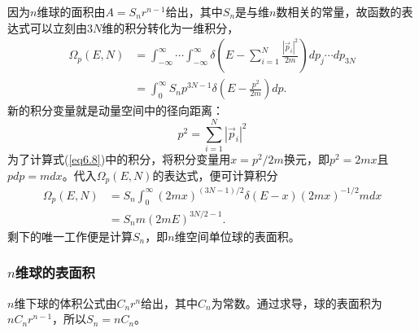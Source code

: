 \documentclass[UTF8]{ctexart}
\numberwithin{equation}{section}%
\numberwithin{figure}{section}%
\begin{document}
    因为$n$维球的面积由$A=S_nr^{n-1}$给出，其中$S_n$是与维$n$数相关的常量，故函数的表达式可以立刻由$3N$维的积分转化为一维积分，
    \begin{equation}\label{eq6.8}
        \begin{aligned}
            \Omega_{p}(E, N) &=\int_{-\infty}^{\infty} \cdots \int_{-\infty}^{\infty} \delta\left(E-\sum_{i=1}^{N} \frac{\left|\vec{p}_{i}\right|^{2}}{2 m}\right) d p_{j} \cdots d p_{3 N} \\
            &=\int_{0}^{\infty} S_{n} p^{3 N-1} \delta\left(E-\frac{p^{2}}{2 m}\right) d p .
            \end{aligned}
    \end{equation}
    新的积分变量就是动量空间中的径向距离：
    \begin{equation}
        p^{2}=\sum_{i=1}^{N}\left|\vec{p}_{i}\right|^{2}
    \end{equation}
    为了计算式(\ref{eq6.8})中的积分，将积分变量用$x=p^2/2m$换元，即$p^2=2mx$且$pdp=mdx$。代入$\Omega_p(E,N)$的表达式，便可计算积分
    \begin{equation}\label{eq6.10}
        \begin{aligned}
            \Omega_{p}(E, N) &=S_{n} \int_{0}^{\infty}(2 m x)^{(3 N-1) / 2} \delta(E-x)(2 m x)^{-1 / 2} m d x \\
            &=S_{n} m(2 m E)^{3 N / 2-1} .
            \end{aligned}
    \end{equation}
    剩下的唯一工作便是计算$S_n$，即$n$维空间单位球的表面积。
    \subsubsection{\texorpdfstring{$n$维球的表面积}{n维球的表面积}}
    $n$维下球的体积公式由$C_nr^n$给出，其中$C_n$为常数。通过求导，球的表面积为$nC_nr^{n-1}$，所以$S_n=nC_n$。
\end{document}
